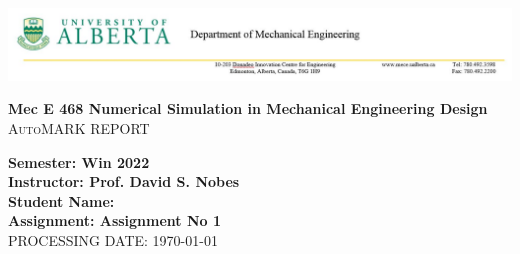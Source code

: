 \documentclass{article}
\begin{document}
\begin{center}
\includegraphics[scale=0.5]{./IncludeImages/LetterHead.jpg}
\end{center}

\begin{center}
\textbf{\huge Mec E 468 Numerical Simulation in Mechanical Engineering Design}\\[1cm] %
\textsc{\LARGE AutoMARK REPORT}\\[0.5cm] %
\end{center}
 \bigskip
\linespread{1.5} %
\begin{flushleft} \large
\textbf{Semester: Win 2022}\\
\textbf{Instructor: Prof. David S. Nobes}\\
\textbf{Student Name: }\\
\textbf{Assignment: Assignment No 1}\\ 
PROCESSING DATE: {\large \today}\\[0.5cm] %
\end{flushleft}
%
\end{document}

